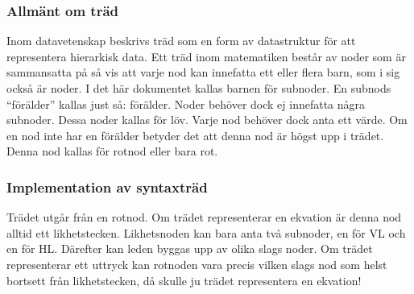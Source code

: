 \documentclass[12pt,a4paper]{article}
\begin{document}
\subsubsection{Allmänt om träd}
Inom datavetenskap beskrivs träd som en form av datastruktur för att representera hierarkisk data. Ett träd inom matematiken består av noder som är sammansatta på så vis att varje nod kan innefatta ett eller flera barn, som i sig också är noder. I det här dokumentet kallas barnen för subnoder. En subnods ``förälder'' kallas just så: förälder. Noder behöver dock ej innefatta några subnoder. Dessa noder kallas för löv. Varje nod behöver dock anta ett värde. Om en nod inte har en förälder betyder det att denna nod är högst upp i trädet. Denna nod kallas för rotnod eller bara rot.
\subsubsection{Implementation av syntaxträd}
Trädet utgår från en rotnod. Om trädet representerar en ekvation är denna nod alltid ett likhetstecken. Likhetsnoden kan bara anta två subnoder, en för VL och en för HL. Därefter kan leden byggas upp av olika slags noder. Om trädet representerar ett uttryck kan rotnoden vara precis vilken slags nod som helst bortsett från likhetstecken, då skulle ju trädet representera en ekvation!
\end{document}
